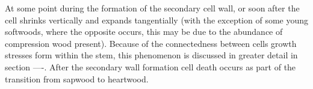At some point during the formation of the secondary cell wall, or soon after the
cell shrinks vertically and expands tangentially \cite{Boyd_1972} (with the exception of
some young softwoods, where the opposite occurs, this may be due to
the abundance of compression wood present). Because of the connectedness
between cells growth stresses form within the stem, this phenomenon is discussed
in greater detail in section ----. After the secondary wall formation cell death
occurs as part of the transition from sapwood to heartwood.